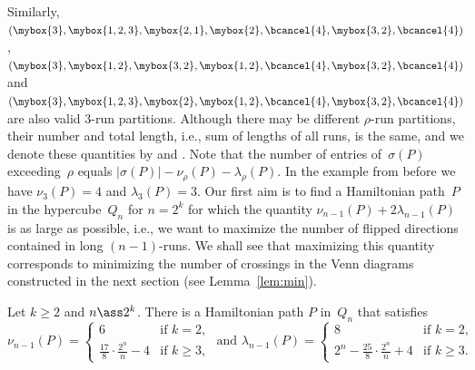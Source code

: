 Similarly, $(\mybox{3},\mybox{1,2,3},\mybox{2,1},\mybox{2},\bcancel{4},\mybox{3,2},\bcancel{4})$, $(\mybox{3},\mybox{1,2},\mybox{3,2},\mybox{1,2},\bcancel{4},\mybox{3,2},\bcancel{4})$ and $(\mybox{3},\mybox{1,2,3},\mybox{2},\mybox{1,2},\bcancel{4},\mybox{3,2},\bcancel{4})$ are also valid 3-run partitions.
%
Although there may be different $\rho$-run partitions, their number and total length, i.e., sum of lengths of all runs, is the same, and we denote these quantities by  and .
Note that the number of entries of~$\sigma(P)$ exceeding~$\rho$ equals $|\sigma(P)|-\nu_\rho(P)-\lambda_\rho(P)$.
In the example from before we have $\nu_3(P)=4$ and $\lambda_3(P)=3$.
%
Our first aim is to find a Hamiltonian path~$P$ in the hypercube~$Q_n$ for $n=2^k$ for which the quantity $\nu_{n-1}(P)+2\lambda_{n-1}(P)$ is as large as possible, i.e., we want to maximize the number of flipped directions contained in long $(n-1)$-runs.
We shall see that maximizing this quantity corresponds to minimizing the number of crossings in the Venn diagrams constructed in the next section (see Lemma~\ref{lem:min}).
%
\begin{lemma}
\label{lem:run}
Let $k\geq 2$ and $n\ass 2^k$.
There is a Hamiltonian path $P$ in~$Q_n$ that satisfies
\[ \nu_{n-1}(P)=\begin{cases}
               6& \text{if } k=2, \\
               \frac{17}{8}\cdot\frac{2^n}{n}-4 & \text{if } k\ge 3,
               \end{cases} \text{   and   }
\lambda_{n-1}(P)=\begin{cases}
                 8 & \text{if } k=2, \\
                 2^n-\frac{25}{8}\cdot \frac{2^n}{n}+4 & \text{if } k\ge 3.
                 \end{cases} \]
\end{lemma}
%

